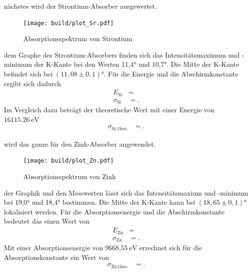 \justifying nächstes wird der Strontium-Absorber ausgewertet.


\begin{figure}[H]
    \centering
    \texttt{[image: build/plot\_Sr.pdf]}
    \caption{Absorptionsspektrum von Strontium\cite{matplotlib}}
    \label{fig:7}
\end{figure}
\justifying dem Graphe des Strontium-Absorbers finden sich das Intensitätsmaximum
und -minimum der K-Kante bei den Werten 11,4° und 10,7°.
Die Mitte der K-Kante befindet sich bei $(11,08\pm0,1)° $.
Für die Energie und die Abschirmkonstante ergibt sich dadurch
\begin{align}
    E_{\text{Sr}}&= \text{} \label{eq:36}\\
    \sigma _{\text{Sr}} &= \text{} \label{eq:37}.
\end{align}
Im Vergleich dazu beträgt der theoretische Wert  mit einer Energie von $\SI{16115.26}{\electronvolt} $ \cite{NIST}
\begin{align}
    \sigma _{\text{Sr,theo.}} &= \text{} \label{eq:38}.
\end{align}


\justifying wird das ganze für den Zink-Absorber angewendet.


\begin{figure}[H]
    \centering
    \texttt{[image: build/plot\_Zn.pdf]}
    \caption{Absorptionsspektrum von Zink\cite{matplotlib}}
    \label{fig:8}
\end{figure}

\justifying der Graphik und den Messwerten lässt sich das Intensitätsmaxium und 
-minimum bei 19,0° und 18,4° bestimmen.
Die Mitte der K-Kante kann bei $(18,65\pm 0,1)° $ lokalisiert werden.
Für die Absorptionsenergie und die Abschirmkonstante bedeutet das einen Wert von
\begin{align}
    E_{\text{Zn}} &= \text{} \label{eq:39}\\
    \sigma _{\text{Zn}} &= \text{} \label{eq:40}.
\end{align}
Mit einer Absorptionsenergie von $\SI{9668.55}{\electronvolt} $ \cite{NIST} errechnet
sich für die Absorptionskonstante ein Wert von
\begin{align}
    \sigma _{\text{Zn,theo.}}&= \text{} \label{eq:41}.
\end{align}


